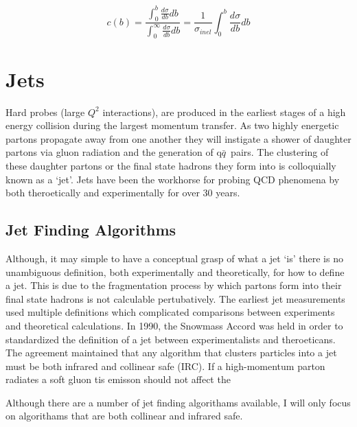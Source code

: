 \begin{equation}
c(b) =\frac{ \int_{0}^{b} \frac{d \sigma}{db} db}{ \int_{0}^{\infty} \frac{d \sigma}{db} db} = \frac{1}{\sigma_{inel}} \int_{0}^{b} \frac{d \sigma}{db} db
\label{eq:centrality}
\end{equation}




\section{Jets}

Hard probes (large $Q^{2}$ interactions), are produced in the earliest stages of a high energy collision during the largest momentum transfer.  As two highly energetic partons propagate away from one another they will instigate a shower of daughter partons via gluon radiation and the generation of q$\bar{q}$\, pairs.  The clustering of these daughter partons or the final state hadrons they form into is colloquially known as a `jet'.   Jets have been the workhorse for probing QCD phenomena by both theroetically and experimentally for over 30 years.  

\subsection{Jet Finding Algorithms}
Although, it may simple to have a conceptual grasp of what a jet `is' there is no unambiguous definition, both experimentally and theoretically, for how to define a jet.  This is due to the fragmentation process by which partons form into their final state hadrons is not calculable pertubatively.  The earliest jet measurements used multiple definitions which complicated comparisons between experiments and theoretical calculations.  In 1990, the Snowmass Accord\cite{Huth:217490} was held in order to standardized the definition of a jet between experimentalists and theroeticans.  The agreement maintained that any algorithm that clusters particles into a jet must be both infrared and collinear safe (IRC).  If a high-momentum parton radiates a soft gluon tis emisson should not affect the 

Although there are a number of jet finding algorithams available, I will only focus on algorithams that are both collinear and infrared safe.   





